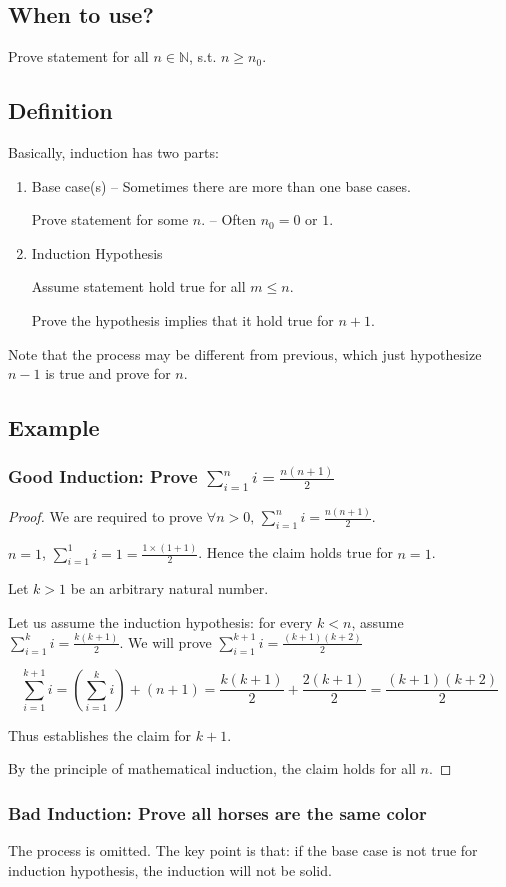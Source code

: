 \subsection{When to use?}

Prove statement for all $n \in \mathbb{N}$, s.t. $n \geq n_0$.

\subsection{Definition}
Basically, induction has two parts:
\begin{enumerate}
\item {Base case(s) -- Sometimes there are more than one base cases.

Prove statement for some $n$. -- Often $n_0 = 0 \text{ or } 1$.}

\item {Induction Hypothesis

Assume statement hold true for all $m \leq n$.

Prove the hypothesis implies that it hold true for $n+1$.}
\end{enumerate}

Note that the process may be different from previous, which just hypothesize $n-1$ is true and prove for $n$.

\subsection{Example}
\subsubsection{Good Induction: Prove $\sum _{i=1}^n i = \frac{n(n+1)}{2}$}

\begin{proof}
We are required to prove $\forall n > 0 \text{, } \sum _{i=1}^n i = \frac{n(n+1)}{2}$.


\BaseCase $n=1$, $\sum _{i=1}^1 i = 1 = \frac{1\times (1+1)}{2}$. Hence the claim holds true for $n=1$.

\InductionStep Let $k > 1$ be an arbitrary natural number.

Let us assume the induction hypothesis: for every $k < n$, assume $\sum _{i=1}^k i = \frac{k(k+1)}{2}$. We will prove $\sum _{i=1}^{k+1} i = \frac{(k+1)(k+2)}{2}$

\begin{equation}
\sum _{i=1}^{k+1} i = \left(\sum _{i=1}^{k} i \right) + (n+1)
                    = \frac{k(k+1)}{2} + \frac{2(k+1)}{2}
                    = \frac{(k+1)(k+2)}{2}
\end{equation}

Thus establishes the claim for $k+1$.

\InductionConclusion By the principle of mathematical induction, the claim holds for all $n$.
\end{proof}

\subsubsection{Bad Induction: Prove all horses are the same color}

The process is omitted. The key point is that: if the base case is not true for induction hypothesis, the induction will not be solid.




